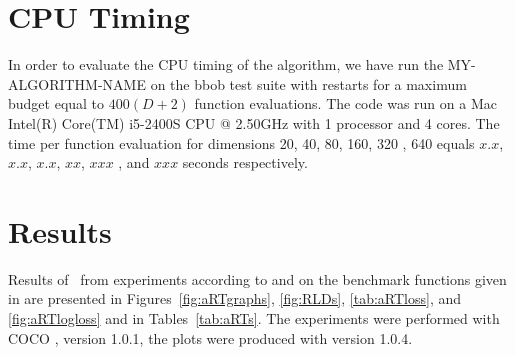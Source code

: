 \documentclass{sig-alternate}
\newcommand{\change}[1]{{\color{red} #1}}
\begin{document}
\section{CPU Timing}
In order to evaluate the CPU timing of the algorithm, we have run the \change{MY-ALGORITHM-NAME} on the  \change{bbob test suite \cite{hansen2009fun}} with restarts for a maximum budget equal to \change{$400 (D + 2)$} function evaluations. The code was run on a \change{Mac Intel(R) Core(TM) i5-2400S CPU @ 2.50GHz} with \change{1} processor and \change{4} cores. The time per function evaluation for dimensions 20, 40, 80, 160, 320\change{, 640} equals \change{$x.x$}, \change{$x.x$}, \change{$x.x$}, \change{$xx$}, \change{$xxx$}\change{, and $xxx$} seconds respectively. 


\section{Results}

Results of \algname\ from experiments according to \cite{hansen2016exp} and \cite{hansen2016perfass} on the benchmark
functions given in \cite{wp200901_2010,hansen2012fun} are presented in
Figures~\ref{fig:aRTgraphs}, \ref{fig:RLDs}, \ref{tab:aRTloss}, and \ref{fig:aRTlogloss} and in
Tables~\ref{tab:aRTs}. The experiments were performed with COCO \cite{hansen2016cocoplat}, version \change{1.0.1}, the plots were produced with version \change{1.0.4}.



\end{document}
